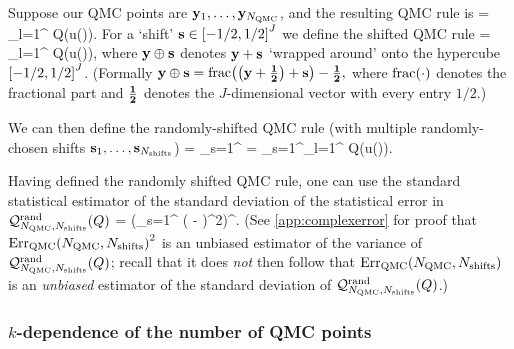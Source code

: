     Suppose our QMC points are $\mathbf{y}_{1},\ldots,\mathbf{y}_{N_{\mathrm{QMC}}}$, and the resulting QMC rule is
    \beqs
{} = \sum_{l=1}^{\NQMC} Q\mleft(u\mleft(\byl\mright)\mright).
\eeqs
For a `shift' $\shift \in \cube{J}$ we define the shifted QMC rule
\beqs
{} = \sum_{l=1}^{\NQMC} Q\mleft(u\mleft(\byl\oplus\shift\mright)\mright),
\eeqs
where $\mathbf{y} \oplus \mathbf{s}$ denotes $\mathbf{y} + \mathbf{s}$ `wrapped around' onto the hypercube $\cube{J}$. (Formally $\by \oplus \shift = \fracoperator{\mleft(\by + \bhalf\mright)+\shift} - \bhalf,$ where $\fracoperator{\cdot}$ denotes the fractional part and $\mathbf{\frac{1}{2}}$ denotes the $J$-dimensional vector with every entry $1/2.$)

We can then define the randomly-shifted QMC rule (with multiple randomly-chosen shifts $\mathbf{s}_{1},\ldots,\mathbf{s}_{N_{\mathrm{shifts}}}$)
\beqs
{} = \sum_{s=1}^{\Nshifts}  = \sum_{s=1}^{\Nshifts}\sum_{l=1}^{\NQMC} Q\mleft(u\mleft(\byl\oplus \shifts\mright)\mright).
\eeqs

Having defined the randomly shifted QMC rule, one can use the standard statistical estimator of the standard deviation of the statistical error in $\QMCrandshift{Q}{\Nshifts}$ \cite[Equation (4.6)]{GrKuNuScSl:11}
\beq\label{eq:errest}
\QMCerror{\NQMC}{\Nshifts} = \mleft(\sum_{s=1}^{\Nshifts} \mleft( - \mright)^2\mright)^{\half}.
\eeq
(See \cref{app:complexerror} for proof that $\QMCerror{\NQMC}{\Nshifts}^2$ is an unbiased estimator of the variance of $\QMCrandshift{Q}{\Nshifts}$; recall that it does \emph{not} then follow that $\QMCerror{\NQMC}{\Nshifts}$ is an \emph{unbiased} estimator of the standard deviation of $\QMCrandshift{Q}{\Nshifts}$.)

\subsubsection{$k$-dependence of the number of QMC points}

